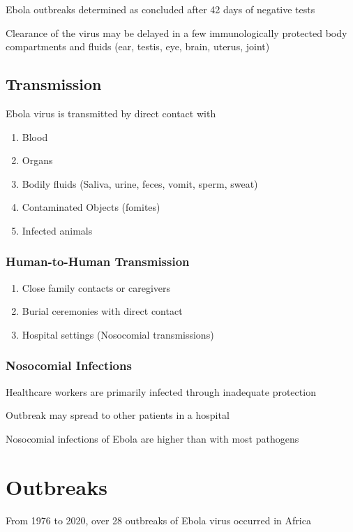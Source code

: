 \documentclass{notes}
\begin{document}
Ebola outbreaks determined as concluded after 42 days of negative tests

Clearance of the virus may be delayed in a few immunologically protected body compartments and fluids (ear, testis, eye, brain, uterus, joint)

\subsection{Transmission}

Ebola virus is transmitted by direct contact with

\begin{enumerate}
    \item Blood
    \item Organs
    \item Bodily fluids (Saliva, urine, feces, vomit, sperm, sweat)
    \item Contaminated Objects (fomites)
    \item Infected animals
\end{enumerate}

\subsubsection{Human-to-Human Transmission}

\begin{enumerate}
    \item Close family contacts or caregivers
    \item Burial ceremonies with direct contact
    \item Hospital settings (Nosocomial transmissions)
\end{enumerate}

\subsubsection{Nosocomial Infections}

Healthcare workers are primarily infected through inadequate protection

Outbreak may spread to other patients in a hospital

Nosocomial infections of Ebola are higher than with most pathogens

\section{Outbreaks}

From 1976 to 2020, over 28 outbreaks of Ebola virus occurred in Africa
\end{document}
